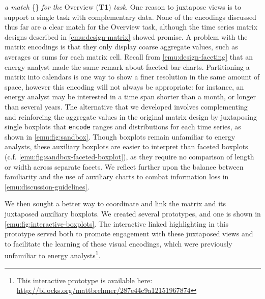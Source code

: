  {\it a match} \{\match\} {\it for the} Overview ({\bf T1}) {\it task}.
One reason to juxtapose views is to support a single task with complementary data.
None of the encodings discussed thus far are a clear match for the Overview task, although the time series matrix designs described in \autoref{emu:design-matrix} showed promise.
A problem with the matrix encodings is that they only display coarse aggregate values, such as averages or sums for each matrix cell. 
Recall from \autoref{emu:design-faceting} that an energy analyst made the same remark about faceted bar charts.
Partitioning a matrix into calendars is one way to show a finer resolution in the same amount of space, however this encoding will not always be appropriate: for instance, an energy analyst may be interested in a time span shorter than a month, or longer than several years.
The alternative that we developed involves complementing and reinforcing the aggregate values in the original matrix design by juxtaposing single boxplots that {\tt encode} ranges and distributions for each time series, as shown in \autoref{emu:fig:sandbox}.
Though boxplots remain unfamiliar to energy analysts, these auxiliary boxplots are easier to interpret than faceted boxplots (c.f. \autoref{emu:fig:sandbox-faceted-boxplot}), as they require no comparison of length or width across separate facets. 
We reflect further upon the balance between familiarity and the use of auxiliary charts to combat information loss in \autoref{emu:discussion-guidelines}.

We then sought a better way to coordinate and link the matrix and its juxtaposed auxiliary boxplots. 
We created several prototypes, and one is shown in \autoref{emu:fig:interactive-boxplots}.
The interactive linked highlighting in this prototype served both to promote engagement with these juxtaposed views and to facilitate the learning of these visual encodings, which were previously unfamiliar to energy analysts\footnote{This interactive prototype is available here: \url{http://bl.ocks.org/mattbrehmer/287e44c9a12151967874}}.

